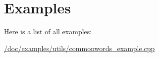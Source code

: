 \section{Examples}
Here is a list of all examples:\begin{DoxyCompactItemize}
\item 
\hyperlink{_2doc_2examples_2utils_2commonwords_example_8cpp-example}{/doc/examples/utils/commonwords\_\-example.cpp}
\end{DoxyCompactItemize}
